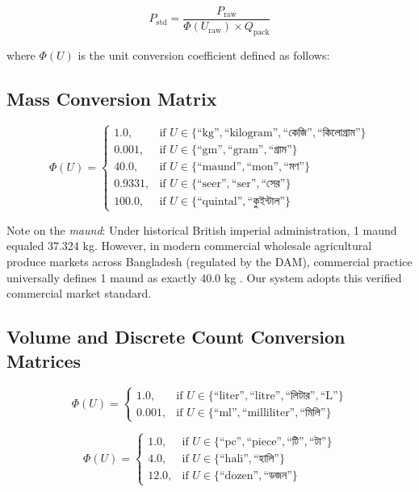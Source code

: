 \begin{equation}
P_{\text{std}} = \frac{P_{\text{raw}}}{\Phi(U_{\text{raw}}) \times Q_{\text{pack}}}
\end{equation}

where $\Phi(U)$ is the unit conversion coefficient defined as follows:

\subsection{Mass Conversion Matrix}
\begin{equation}
\Phi(U) = \begin{cases}
1.0, & \text{if } U \in \{\text{``kg''}, \text{``kilogram''}, \text{``কেজি''}, \text{``কিলোগ্রাম''}\} \\
0.001, & \text{if } U \in \{\text{``gm''}, \text{``gram''}, \text{``গ্রাম''}\} \\
40.0, & \text{if } U \in \{\text{``maund''}, \text{``mon''}, \text{``মণ''}\} \\
0.9331, & \text{if } U \in \{\text{``seer''}, \text{``ser''}, \text{``সের''}\} \\
100.0, & \text{if } U \in \{\text{``quintal''}, \text{``কুইন্টাল''}\}
\end{cases}
\end{equation}

Note on the \textit{maund}: Under historical British imperial administration, 1 maund equaled 37.324 kg. However, in modern commercial wholesale agricultural produce markets across Bangladesh (regulated by the DAM), commercial practice universally defines 1 maund as exactly 40.0 kg \cite{dam2024daily}. Our system adopts this verified commercial market standard.

\subsection{Volume and Discrete Count Conversion Matrices}
\begin{equation}
\Phi(U) = \begin{cases}
1.0, & \text{if } U \in \{\text{``liter''}, \text{``litre''}, \text{``লিটার''}, \text{``L''}\} \\
0.001, & \text{if } U \in \{\text{``ml''}, \text{``milliliter''}, \text{``মিলি''}\}
\end{cases}
\end{equation}

\begin{equation}
\Phi(U) = \begin{cases}
1.0, & \text{if } U \in \{\text{``pc''}, \text{``piece''}, \text{``টি''}, \text{``টা''}\} \\
4.0, & \text{if } U \in \{\text{``hali''}, \text{``হালি''}\} \\
12.0, & \text{if } U \in \{\text{``dozen''}, \text{``ডজন''}\}
\end{cases}
\end{equation}

